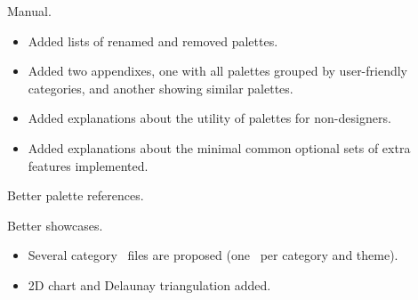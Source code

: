 \documentclass{tutodoc}
\begin{document}
\begin{tdocupdate}
    \item Manual.
    \begin{itemize}
        \item Added lists of renamed and removed palettes.

        \item Added two appendixes, one with all palettes grouped by user-friendly categories, and another showing similar palettes.

        \item Added explanations about the utility of palettes for non-designers.

        \item Added explanations about the minimal common optional sets of extra features implemented.
    \end{itemize}


    \item Better palette references.

    \item Better showcases.
    \begin{itemize}
        \item Several category \pdf\ files are proposed (one \pdf\ per category and theme).

        \item 2D chart and Delaunay triangulation added.
    \end{itemize}
\end{tdocupdate}
\end{document}

